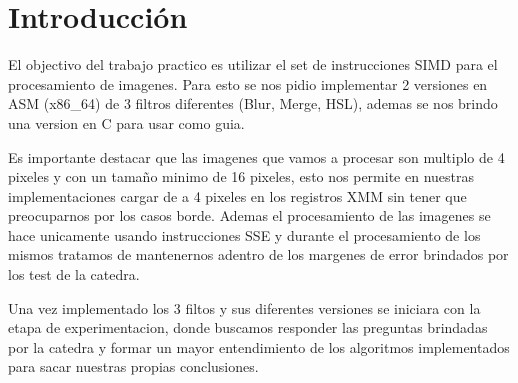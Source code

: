 \section{Introducción}

El objectivo del trabajo practico es utilizar el set de instrucciones SIMD para el procesamiento de imagenes.
Para esto se nos pidio implementar 2 versiones en ASM (x86_64) de 3 filtros diferentes (Blur, Merge, HSL), ademas se nos brindo una version en C para usar como guia.

Es importante destacar que las imagenes que vamos a procesar son multiplo de 4 pixeles y con un tamaño minimo de 16 pixeles, esto nos permite en nuestras implementaciones cargar de a 4 pixeles en los registros XMM sin tener que preocuparnos por los casos borde.
Ademas el procesamiento de las imagenes se hace unicamente usando instrucciones SSE y durante el procesamiento de los mismos tratamos de mantenernos adentro de los margenes de error brindados por los test de la catedra.

Una vez implementado los 3 filtos y sus diferentes versiones se iniciara con la etapa de experimentacion, donde buscamos responder las preguntas brindadas por la catedra y formar un mayor entendimiento de los algoritmos implementados para sacar nuestras propias conclusiones.